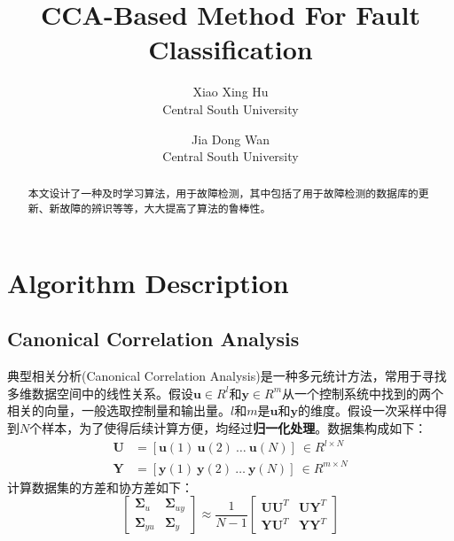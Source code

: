 \documentclass[lang=cn,11pt,a4paper]{elegantpaper}
\title{CCA-Based Method For Fault Classification}
\author{Xiao Xing Hu \\ Central South University \and Jia Dong Wan \\ Central South University}
\date{\zhtoday}
\begin{document}
\maketitle

\begin{abstract}
本文设计了一种及时学习算法，用于故障检测，其中包括了用于故障检测的数据库的更新、新故障的辨识等等，大大提高了算法的鲁棒性。
\end{abstract}


\section{Algorithm Description}

\subsection{Canonical Correlation Analysis}
典型相关分析(Canonical Correlation Analysis)是一种多元统计方法，常用于寻找多维数据空间中的线性关系。假设$\boldsymbol{u}\in R^l$和$\boldsymbol{y}\in R^m$从一个控制系统中找到的两个相关的向量，一般选取控制量和输出量。$l$和$m$是$\boldsymbol{u}$和$\boldsymbol{y}$的维度。假设一次采样中得到$N$个样本，为了使得后续计算方便，均经过\textbf{归一化处理}。数据集构成如下：
\begin{equation}
	\begin{aligned}
		\boldsymbol{U}  &= [\boldsymbol{u}(1) \ \boldsymbol{u}(2) \ \ldots \ \boldsymbol{u}(N)]\ \in R^{l\times N}\\
		\boldsymbol{Y}  &= [\boldsymbol{y}(1) \ \boldsymbol{y}(2) \ \ldots \ \boldsymbol{y}(N)]\ \in R^{m\times N}
	\end{aligned}
\end{equation}
计算数据集的方差和协方差如下：
\begin{equation}
	\left[\begin{array}{cc}
		\boldsymbol{\Sigma}_{u} & \boldsymbol{\Sigma}_{u y} \\
		\boldsymbol{\Sigma}_{y u} & \boldsymbol{\Sigma}_{y}
	\end{array}\right] \approx \frac{1}{N-1}\left[\begin{array}{l|l}
		\boldsymbol{U U}^{T} & \boldsymbol{U} \boldsymbol{Y}^{T} \\
		\boldsymbol{Y U}^{T} & \boldsymbol{Y} \boldsymbol{Y}^{T}
	\end{array}\right]
\end{equation}
\end{document}
